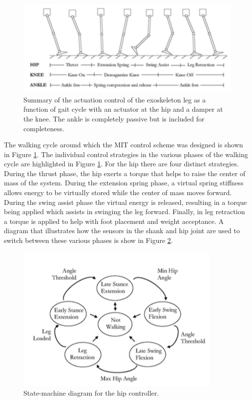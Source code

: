 \begin{refsection}
\begin{figure}[thpb]
\centering
\includegraphics[width=4.in]{exos/figs/MIT/walkingCycle}
  \caption{ Summary of the actuation control of the exoskeleton leg as a function of gait cycle with an actuator at the hip and a damper at the knee. The ankle is completely passive but is included for completeness.}
 \label{fig:walkingCycle} 
 \end{figure} 
The walking cycle around which the MIT control scheme was designed is shown in Figure \ref{fig:walkingCycle}.  The individual control strategies in the various phases of the walking cycle are highlighted in Figure \ref{fig:walkingCycle}.  For the hip there are four distinct strategies.  During the thrust phase, the hip exerts a torque that helps to raise the center of mass of the system.  During the extension spring phase, a virtual spring stiffness allows energy to be virtually stored while the center of mass moves forward.  During the swing assist phase the virtual energy is released, resulting in a torque being applied which assists in swinging the leg forward.  Finally, in leg retraction a torque is applied to help with foot placement and weight acceptance.  A diagram that illustrates how the sensors in the shank and hip joint are used to switch between these various phases is show in Figure \ref{fig:hipControl}.
 \begin{figure}[thpb]
\centering
\includegraphics[width=3.in]{exos/figs/MIT/hipControl}
  \caption{State-machine diagram for the hip controller.}
 \label{fig:hipControl} 
 \end{figure}  
 

\end{refsection}
